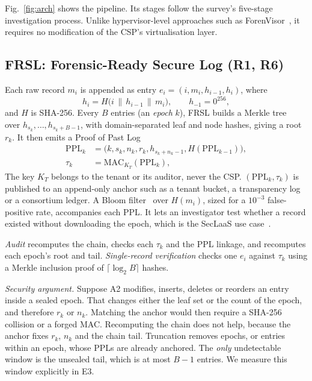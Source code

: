 \documentclass[conference,10pt]{IEEEtran}
\begin{document}
Fig.~\ref{fig:arch} shows the pipeline. Its stages follow the survey's five-stage investigation process. Unlike hypervisor-level approaches such as ForenVisor~\cite{qi2017}, it requires no modification of the CSP's virtualisation layer.

\subsection{FRSL: Forensic-Ready Secure Log (R1, R6)}
\label{sec:frsl}
Each raw record $m_i$ is appended as entry $e_i=(i, m_i, h_{i-1}, h_i)$, where
\begin{equation}
h_i = H\big(i \,\|\, h_{i-1} \,\|\, m_i\big),\qquad h_{-1}=0^{256},
\end{equation}
and $H$ is SHA-256. Every $B$ entries (an \emph{epoch} $k$), FRSL builds a Merkle tree~\cite{merkle1987} over $h_{s_k},\dots,h_{s_k+B-1}$, with domain-separated leaf and node hashes, giving a root $r_k$. It then emits a Proof of Past Log
\begin{align}
\mathrm{PPL}_k &= \big(k, s_k, n_k, r_k, h_{s_k+n_k-1}, H(\mathrm{PPL}_{k-1})\big),\\
\tau_k &= \mathrm{MAC}_{K_T}(\mathrm{PPL}_k),
\end{align}
The key $K_T$ belongs to the tenant or its auditor, never the CSP. $(\mathrm{PPL}_k,\tau_k)$ is published to an append-only anchor such as a tenant bucket, a transparency log or a consortium ledger. A Bloom filter~\cite{bloom1970} over $H(m_i)$, sized for a $10^{-3}$ false-positive rate, accompanies each PPL. It lets an investigator test whether a record existed without downloading the epoch, which is the SecLaaS use case~\cite{zawoad2016}.

\emph{Audit} recomputes the chain, checks each $\tau_k$ and the PPL linkage, and recomputes each epoch's root and tail. \emph{Single-record verification} checks one $e_i$ against $\tau_k$ using a Merkle inclusion proof of $\lceil\log_2 B\rceil$ hashes.

\emph{Security argument.} Suppose A2 modifies, inserts, deletes or reorders an entry inside a sealed epoch. That changes either the leaf set or the count of the epoch, and therefore $r_k$ or $n_k$. Matching the anchor would then require a SHA-256 collision or a forged MAC. Recomputing the chain does not help, because the anchor fixes $r_k$, $n_k$ and the chain tail. Truncation removes epochs, or entries within an epoch, whose PPLs are already anchored. The \emph{only} undetectable window is the unsealed tail, which is at most $B-1$ entries. We measure this window explicitly in E3.
\end{document}
